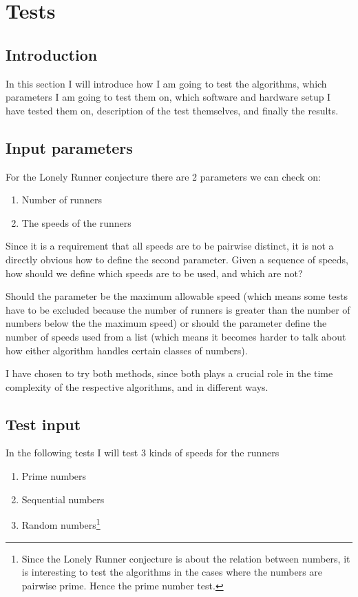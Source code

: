 \section{Tests}
\label{test}

\subsection{Introduction}
In this section I will introduce how I am going to test the algorithms, which parameters I am going to test them on, which software and hardware setup I have tested them on, description of the test themselves, and finally the results.

\subsection{Input parameters}
For the Lonely Runner conjecture there are 2 parameters we can check
on:
\begin{enumerate}
\item Number of runners
\item The speeds of the runners
\end{enumerate}

Since it is a requirement that all speeds are to be pairwise distinct,
it is not a directly obvious how to define the second
parameter. Given a sequence of speeds, how should we define which
speeds are to be used, and which are not? 

Should the parameter be the maximum allowable speed (which means some tests have to be
excluded because the number of runners is greater than the number of numbers below the the maximum speed) or should the parameter define the number of speeds used from a list (which means it becomes
harder to talk about how either algorithm handles certain classes of
numbers).

I have chosen to try both methods, since both plays a crucial role in
the time complexity of the respective algorithms, and in different ways.

\subsection{Test input}
In the following tests I will test 3 kinds of speeds for the runners
\begin{enumerate}
\item Prime numbers
\item Sequential numbers
\item Random numbers\footnote{Since the Lonely Runner conjecture is about the relation between numbers, it is interesting to test the algorithms in the cases where the numbers are pairwise prime. Hence the prime number test.}
\end{enumerate}

